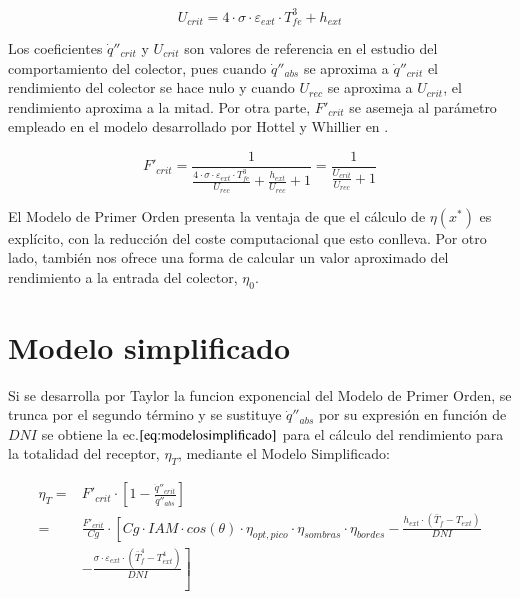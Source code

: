 \begin{equation}
    U_{crit} = 4 \cdot \sigma \cdot \varepsilon_{ext} \cdot T^{3}_{fe} + h_{ext}
    \label{eq:ucrit}
\end{equation}

Los coeficientes \(\dot q''_{crit}\) y \(U_{crit}\) son valores de referencia en el estudio del comportamiento del colector, pues cuando \(\dot q''_{abs}\) se aproxima a \(\dot q''_{crit}\) el rendimiento del colector se hace nulo y cuando \(U_{rec}\) se aproxima a \(U_{crit}\), el rendimiento aproxima a la mitad. Por otra parte, \(F'_{crit}\) se asemeja al parámetro empleado en el modelo desarrollado por Hottel y Whillier en \cite{hottelEvaluationFlatplateSolar1955}.

\begin{equation}
    F'_{crit} = \frac{1}{\frac{4 \cdot \sigma \cdot \varepsilon_{ext} \cdot T^{3}_{fe}}{U_{rec}} + \frac{h_{ext}}{U_{rec}} +1} = \frac{1}{\frac{U_{crit}}{U_{rec}}+1}
    \label{eq:fcrit}
\end{equation}

El Modelo de Primer Orden presenta la ventaja de que el cálculo de \(\eta(x^{*})\) es explícito, con la reducción del coste computacional que esto conlleva. Por otro lado, también nos ofrece una forma de calcular un valor aproximado del rendimiento a la entrada del colector, \(\eta_{0}\).

\section{Modelo simplificado}
Si se desarrolla por Taylor la funcion exponencial del Modelo de Primer Orden, se trunca por el segundo término y se sustituye \(\dot q''_{abs}\) por su expresión en función de \(DNI\) se obtiene la ec.\(\eqref{eq:modelosimplificado}\) para el cálculo del rendimiento para la totalidad del receptor, $\eta_{T}$, mediante el Modelo Simplificado:

\begin{equation}
\begin{split}
\eta_{T}	 = & F'_{crit} \cdot \left[1 - \frac{\dot q''_{crit}}{\dot q''_{abs}}\right]  \\
 		 = & \frac{F'_{crit}}{Cg} \cdot \left[Cg \cdot IAM \cdot cos(\theta) \cdot \eta_{opt,pico} \cdot \eta_{sombras} \cdot \eta_{bordes}\right. - \frac{h_{ext}\cdot (\bar{T}_{f}-T_{ext})}{DNI} \\
& \left. - \frac{\sigma \cdot \varepsilon_{ext}\cdot(\bar{T}^{4}_{f}-T^{4}_{ext})}{DNI}\right] 
\end{split}
    \label{eq:modelosimplificado}
\end{equation}

